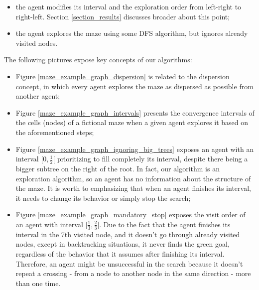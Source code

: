 \begin{itemize}
	\begin{itemize}

	\item the agent modifies its interval and the exploration order from left-right to right-left. Section \ref{section_results} discusses broader about this point;
	
	\item the agent explores the maze using some DFS algorithm, but ignores already visited nodes.
	
	\end{itemize}
\end{itemize}

The following pictures expose key concepts of our algorithms:

\begin{itemize}

\item Figure \ref{maze_example_graph_dispersion} is related to the dispersion concept, in which every agent explores the maze as dispersed as possible from another agent;
	
\item Figure \ref{maze_example_graph_intervals} presents the convergence intervals of the cells (nodes) of a fictional maze when a given agent explores it based on the aforementioned steps;

\item Figure \ref{maze_example_graph_ignoring_big_trees} exposes an agent with an interval $[0,\frac{1}{2}[$ prioritizing to fill completely its interval, despite there being a bigger subtree on the right of the root. In fact, our algorithm is an exploration algorithm, so an agent has no information about the structure of the maze. It is worth to emphasizing that when an agent finishes its interval, it needs to change its behavior or simply stop the search;

\item Figure \ref{maze_example_graph_mandatory_stop} exposes the visit order of an agent with interval $[\frac{1}{3},\frac{2}{3}[$. Due to the fact that the agent finishes its interval in the 7th visited node, and it doesn't go through already visited nodes, except in backtracking situations, it never finds the green goal, regardless of the behavior that it assumes after finishing its interval. Therefore, an agent might be unsuccessful in the search because it doesn't repeat a crossing - from a node to another node in the same direction - more than one time.
	
\end{itemize}

